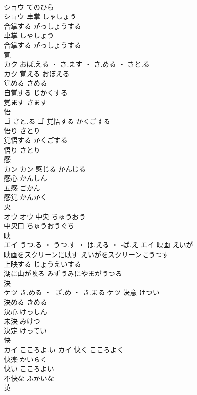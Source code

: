 \documentclass[8pt]{extreport}
\begin{document}
\begin{CJK}{UTF8}{min}
\\	ショウ	てのひら
\\	ショウ	車掌	しゃしょう	
\\	合掌する	がっしょうする	
\\	車掌	しゃしょう	
\\	合掌する	がっしょうする	
\\	覚	
\\	カク	おぼ.える ・ さ.ます ・ さ.める ・ さと.る
\\	カク	覚える	おぼえる	
\\	覚める	さめる	
\\	自覚する	じかくする	
\\	覚ます	さます	
\\	悟	
\\	ゴ	さと.る	ゴ	覚悟する	かくごする	
\\	悟り	さとり	
\\	覚悟する	かくごする	
\\	悟り	さとり	
\\	感	
\\	カン		カン	感じる	かんじる	
\\	感心	かんしん	
\\	五感	ごかん	
\\	感覚	かんかく	
\\	央	
\\	オウ		オウ	中央	ちゅうおう	
\\	中央口	ちゅうおうぐち	
\\	映	
\\	エイ	うつ.る ・ うつ.す ・ は.える ・ -ば.え	エイ	映画	えいが	
\\	映画をスクリーンに映す	えいがをスクリーンにうつす	
\\	上映する	じょうえいする	
\\	湖に山が映る	みずうみにやまがうつる	
\\	決	
\\	ケツ	き.める ・ -ぎ.め ・ き.まる	ケツ	決意	けつい	
\\	決める	きめる	
\\	決心	けっしん	
\\	未決	みけつ	
\\	決定	けってい	
\\	快	
\\	カイ	こころよ.い	カイ	快く	こころよく	
\\	快楽	かいらく	
\\	快い	こころよい	
\\	不快な	ふかいな	
\\	英	

\end{CJK}
\end{document}
